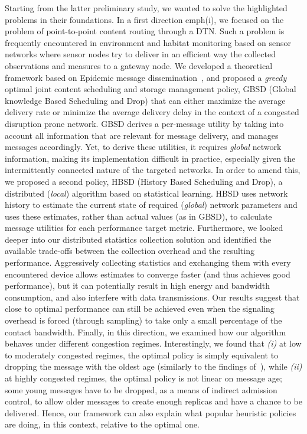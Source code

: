Starting from the latter preliminary study, we wanted to solve the highlighted problems in their foundations. In a first direction emph{(i)}, we focused on the problem of point-to-point content routing through a DTN. Such a problem is frequently encountered in environment and habitat monitoring based on sensor networks where sensor nodes try to deliver in an efficient way the collected observations and measures to a gateway node. We developed a theoretical framework based on Epidemic message dissemination~\cite{haas:mobihoc03,Inria:MessageDelay,akis:mobihoc06}, and proposed a \emph{greedy} optimal joint content scheduling and storage management policy, GBSD (Global knowledge Based Scheduling and Drop) that can either maximize the average delivery rate or minimize the average delivery delay in the context of a congested disruption prone network. GBSD derives a per-message utility by taking into account all information that are relevant for message delivery, and manages messages accordingly. Yet, to derive these utilities, it requires \textit{global} network information, making its implementation difficult in practice, especially given the intermittently connected nature of the targeted networks. In order to amend this, we proposed a second policy, HBSD (History Based Scheduling and Drop), a distributed (\textit{local}) algorithm based on statistical learning. HBSD uses network history to estimate the current state of required (\textit{global}) network parameters and uses these estimates, rather than actual values (as in GBSD), to calculate message utilities for each performance target metric. Furthermore, we looked deeper into our distributed statistics collection solution and identified the available trade-offs between the collection overhead and the resulting performance. Aggressively collecting statistics and exchanging them with every encountered device allows estimates to converge faster (and thus achieves good performance), but it can potentially result in high energy and bandwidth consumption, and also interfere with data transmissions. Our results suggest that close to optimal performance can still be achieved even when the signaling overhead is forced (through sampling) to take only a small percentage of the contact bandwidth. Finally, in this direction, we examined how our algorithm behaves under different congestion regimes. Interestingly, we found that \emph{(i)} at low to moderately congested regimes, the optimal policy is simply equivalent to dropping the message with the oldest age (similarly to the findings of~\cite{QueuingPolicies}), while \emph{(ii)} at highly congested regimes, the optimal policy is not linear on message age; some young messages have to be dropped, as a means of indirect admission control, to allow older messages to create enough replicas and have a chance to be delivered. Hence, our framework can also explain what popular heuristic policies are doing, in this context, relative to the optimal one.

